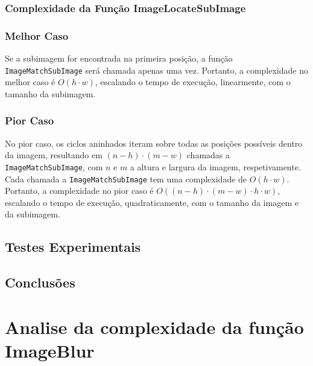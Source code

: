 \documentclass{report}
\begin{document}
\subsubsection{Complexidade da Função ImageLocateSubImage}

\subsubsection{Melhor Caso}
Se a subimagem for encontrada na primeira posição, a função \texttt{ImageMatchSubImage} será chamada apenas uma vez. 
Portanto, a complexidade no melhor caso é \(O(h \cdot w)\), escalando o tempo de execução, linearmente, com o tamanho da subimagem.

\subsubsection{Pior Caso}
No pior caso, os ciclos aninhados iteram sobre todas as posições possíveis dentro da imagem, 
resultando em \((n-h) \cdot (m-w)\) chamadas a \texttt{ImageMatchSubImage}, com \(n\) e \(m\) a altura e largura da imagem, respetivamente. 
Cada chamada a \texttt{ImageMatchSubImage} tem uma complexidade de \(O(h \cdot w)\).
Portanto, a complexidade no pior caso é \(O((n-h) \cdot (m-w) \cdot h \cdot w)\), escalando o tempo de execução, quadraticamente, 
com o tamanho da imagem e da subimagem.

\subsection{Testes Experimentais}




\subsection{Conclusões}


\section{Analise da complexidade da função ImageBlur}
\end{document}

